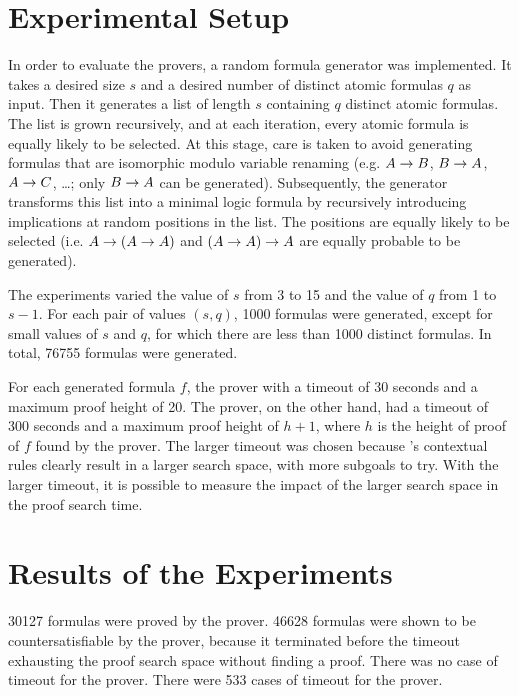 \documentclass{llncs}
\begin{document}
\section{Experimental Setup}
\label{sec:ExperimentalSetup}

In order to evaluate the provers, a random formula generator was implemented. It takes a desired size $s$ and a desired number of distinct atomic formulas $q$ as input. Then it generates a list of length $s$ containing $q$ distinct atomic formulas. The list is grown recursively, and at each iteration, every atomic formula is equally likely to be selected. At this stage, care is taken to avoid generating formulas that are isomorphic modulo variable renaming (e.g. $A \rightarrow B$, $B \rightarrow A$, $A \rightarrow C$, \ldots; only $B \rightarrow A$ can be generated). Subsequently, the generator transforms this list into a minimal logic formula by recursively introducing implications at random positions in the list. The positions are equally likely to be selected (i.e. $A \rightarrow (A \rightarrow A)$ and $(A \rightarrow A) \rightarrow A$ are equally probable to be generated).

The experiments varied the value of $s$ from 3 to 15 and the value of $q$ from 1 to $s-1$. For each pair of values $(s,q)$, 1000 formulas were generated, except for small values of $s$ and $q$, for which there are less than 1000 distinct formulas. In total, 76755 formulas were generated.

For each generated formula $f$, the {\ND} prover with a timeout of 30 seconds and a maximum proof height of 20. The {\NDd} prover, on the other hand, had a timeout of 300 seconds and a maximum proof height of $h + 1$, where $h$ is the height of proof of $f$ found by the {\ND} prover. The larger timeout was chosen because {\NDd}'s contextual rules clearly result in a larger search space, with more subgoals to try. With the larger timeout, it is possible to measure the impact of the larger search space in the proof search time.


\section{Results of the Experiments}
\label{sec:Results}

30127 formulas were proved by the {\ND} prover. 46628 formulas were shown to be countersatisfiable by the {\ND} prover, because it terminated before the timeout exhausting the proof search space without finding a proof. There was no case of timeout for the {\ND} prover. There were 533 cases of timeout for the {\NDd} prover.
\end{document}
